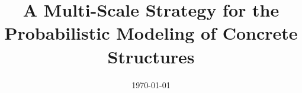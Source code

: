 \documentclass[a4paper, 11pt, oneside]{LJMU_Astro_Thesis}  %
\begin{document}
\frontmatter      %

\title  {A Multi-Scale Strategy for the Probabilistic Modeling of Concrete Structures}
\date       {\today}
\subject    {}
\keywords   {}

\maketitle


\fancyhead{}  %
\rhead{\thepage}  %
\lhead{}  %

\pagestyle{fancy}  %

\pagestyle{plain}
\setcounter{page}{2}

\newpage
%

\newpage

\newpage
%

\newpage




\end{document}

